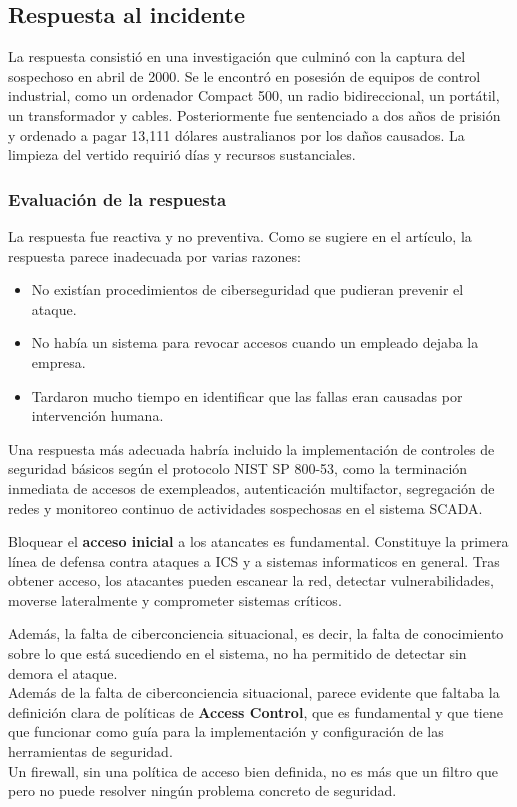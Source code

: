 
\subsection{Respuesta al incidente}
La respuesta consistió en una investigación que culminó con la captura del sospechoso en abril de 2000. Se le encontró en posesión de equipos de control industrial, como un ordenador Compact 500, un radio bidireccional, un portátil, un transformador y cables. Posteriormente fue sentenciado a dos años de prisión y ordenado a pagar 13,111 dólares australianos por los daños causados. La limpieza del vertido requirió días y recursos sustanciales.

\subsubsection{Evaluación de la respuesta}
La respuesta fue reactiva y no preventiva. Como se sugiere en el artículo, la respuesta parece inadecuada por varias razones:

\begin{itemize}
    \item No existían procedimientos de ciberseguridad que pudieran prevenir el ataque.
    \item No había un sistema para revocar accesos cuando un empleado dejaba la empresa.
    \item Tardaron mucho tiempo en identificar que las fallas eran causadas por intervención humana.
\end{itemize}

Una respuesta más adecuada habría incluido la implementación de controles de seguridad básicos según el protocolo NIST SP 800-53, como la terminación inmediata de accesos de exempleados, autenticación multifactor, segregación de redes y monitoreo continuo de actividades sospechosas en el sistema SCADA.

Bloquear el \textbf{acceso inicial} a los atancates es fundamental. Constituye la primera línea de defensa contra ataques a ICS y a sistemas informaticos en general. Tras obtener acceso, los atacantes pueden escanear la red, detectar vulnerabilidades, moverse lateralmente y comprometer sistemas críticos.

Además, la falta de ciberconciencia situacional, es decir, la falta de conocimiento sobre lo que está sucediendo en el sistema, no ha permitido de detectar sin demora el ataque.\\
Además de la falta de ciberconciencia situacional, parece evidente que faltaba la definición clara de políticas de \textbf{Access Control}, que es fundamental y que tiene que funcionar como guía para la implementación y configuración de las herramientas de seguridad.\\
Un firewall, sin una política de acceso bien definida, no es más que un filtro que pero no puede resolver ningún problema concreto de seguridad.
\newpage


